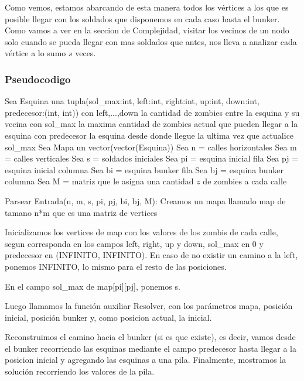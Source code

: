 \medskip

Como vemos, estamos abarcando de esta manera todos los vértices a los que es posible llegar con los soldados que disponemos en cada caso hasta el bunker. Como vamos a ver en la seccion de Complejidad, visitar los vecinos de un nodo solo cuando se pueda llegar con mas soldados que antes, nos lleva a analizar cada vértice a lo sumo $s$ veces.

\pagebreak

\subsubsection{Pseudocodigo}

\begin{codesnippet}
Sea Esquina una tupla(sol_max:int, left:int, right:int,
        up:int, down:int, predecesor:(int, int))
  con left,...,down la cantidad de zombies entre la esquina y su vecina
  con sol_max la maxima cantidad de zombies actual que pueden llegar a la esquina
  con predecesor la esquina desde donde llegue la ultima vez que actualice sol_max
Sea Mapa un vector(vector(Esquina))
Sea n = calles horizontales
Sea m = calles verticales
Sea s = soldados iniciales
Sea pi = esquina inicial fila
Sea pj = esquina inicial columna
Sea bi = esquina bunker fila
Sea bj = esquina bunker columna
Sea M = matriz que le asigna una cantidad $z$ de zombies a cada calle

Parsear Entrada(n, m, s, pi, pj, bi, bj, M):
  Creamos un mapa llamado map de tamano n*m que es una matriz de vertices

  Inicializamos los vertices de map con los valores de los zombis de cada calle,
  segun corresponda en los campos left, right, up y down,
  sol_max en 0 y predecesor en (INFINITO, INFINITO).
  En caso de no existir un camino a la left, ponemos INFINITO,
  lo mismo para el resto de las posiciones.

  En el campo sol_max de map[pi][pj], ponemos s.

  Luego llamamos la función auxiliar Resolver, con los parámetros mapa,
  posición inicial, posición bunker y, como posicion actual, la inicial.

  Reconstruimos el camino hacia el bunker (si es que existe), es decir, vamos
  desde el bunker recorriendo las esquinas mediante el campo predecesor hasta
  llegar a la posicion inicial y agregando las esquinas a una pila. Finalmente,
  mostramos la solución recorriendo los valores de la pila.


\end{codesnippet}
